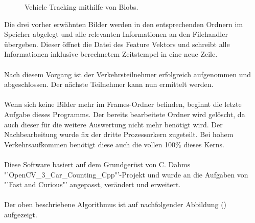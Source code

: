 \begin{figure}[H]
\caption{Vehicle Tracking mithilfe von Blobs.}
\label{bMotionDetection}
\end{figure}

Die drei vorher erwähnten Bilder werden in den entsprechenden Ordnern im Speicher abgelegt und alle relevanten Informationen an den Filehandler übergeben. Dieser öffnet die Datei des Feature Vektors und schreibt alle Informationen inklusive berechnetem Zeitstempel in eine neue Zeile. \\\\
Nach diesem Vorgang ist der Verkehrsteilnehmer erfolgreich aufgenommen und abgeschlossen. Der nächste Teilnehmer kann nun ermittelt werden.\\\\
Wenn sich keine Bilder mehr im Frames-Ordner befinden, beginnt die letzte Aufgabe dieses Programms. Der bereits bearbeitete Ordner wird gelöscht, da auch dieser für die weitere Auswertung nicht mehr benötigt wird. Der Nachbearbeitung wurde fix der dritte Prozessorkern zugeteilt. Bei hohem Verkehrsaufkommen benötigt diese auch die vollen 100\% dieses Kerns.\\\\
Diese Software basiert auf dem Grundgerüst von C. Dahms "'OpenCV\_3\_Car\_Counting\_Cpp"'-Projekt \cite{OpenCVCC} und wurde an die Aufgaben von "'Fast and Curious"' angepasst, verändert und erweitert.\\\\
Der oben beschriebene Algorithmus ist auf nachfolgender Abbildung () aufgezeigt.

